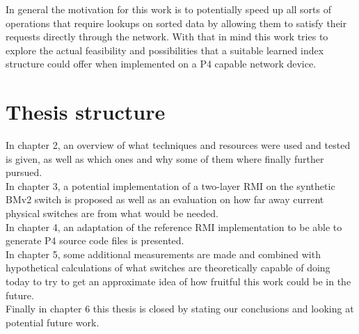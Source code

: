 In general the motivation for this work is to potentially speed up all sorts of operations that require lookups on sorted data by allowing them to satisfy their requests directly through the network. With that in mind this work tries to explore the actual feasibility and possibilities that a suitable learned index structure could offer when implemented on a P4 capable network device.\pagebreak

\section{Thesis structure}
In chapter 2, an overview of what techniques and resources were used and tested is given, as well as which ones and why some of them where finally further pursued.\\

\noindent
In chapter 3, a potential implementation of a two-layer RMI on the synthetic BMv2 switch is proposed as well as an evaluation on how far away current physical switches are from what would be needed.\\

\noindent
In chapter 4, an adaptation of the reference RMI implementation \cite{cdfshop} to be able to generate P4 source code files is presented.\\

\noindent
In chapter 5, some additional measurements are made and combined with hypothetical calculations of what switches are theoretically capable of doing today to try to get an approximate idea of how fruitful this work could be in the future.\\

\noindent
Finally in chapter 6 this thesis is closed by stating our conclusions and looking at potential future work.
